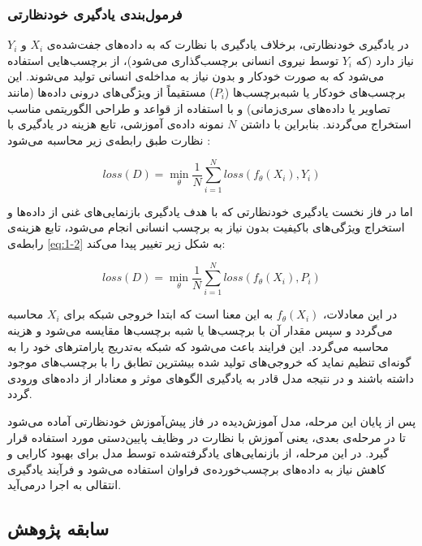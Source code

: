 \subsubsection{فرمول‌بندی یادگیری خودنظارتی}

در یادگیری خودنظارتی، برخلاف یادگیری با نظارت که به داده‌های جفت‌شده‌ی $X_i$ و $Y_i$ نیاز دارد (که $Y_i$ توسط نیروی انسانی برچسب‌گذاری می‌شود)، از برچسب‌هایی استفاده می‌شود که به صورت خودکار و بدون نیاز به مداخله‌ی انسانی تولید می‌شوند. این برچسب‌های خودکار یا شبه‌برچسب‌ها ($P_i$) مستقیماً از ویژگی‌های درونی داده‌ها (مانند تصاویر یا داده‌های سری‌زمانی) و با استفاده از قواعد و طراحی الگوریتمی مناسب استخراج می‌گردند. بنابراین با داشتن $N$ نمونه داده‌ی آموزشی، تابع هزینه در یادگیری با نظارت طبق رابطه‌ی زیر محاسبه می‌شود \cite{jing2020self}:

\begin{equation}
\label{eq:1-2}
loss(D) = \min_{\theta} \frac{1}{N} \sum_{i=1}^{N} loss(f_θ(X_i), Y_i)
\end{equation}

اما در فاز نخست یادگیری خودنظارتی که با هدف یادگیری بازنمایی‌های غنی از داده‌ها و استخراج ویژگی‌های باکیفیت بدون نیاز به برچسب انسانی انجام می‌شود، تابع هزینه‌ی رابطه‌ی \ref{eq:1-2} به شکل زیر تغییر پیدا می‌کند:

\begin{equation}
\label{eq:2-2}
loss(D) = \min_{\theta} \frac{1}{N} \sum_{i=1}^{N} loss(f_θ(X_i), P_i)
\end{equation}

در این معادلات، $f_θ(X_i)$ به این معنا است که ابتدا خروجی شبکه برای $X_i$ محاسبه می‌گردد و سپس مقدار آن با برچسب‌ها یا شبه برچسب‌ها مقایسه می‌شود و هزینه محاسبه می‌گردد. این فرایند باعث می‌شود که شبکه به‌تدریج پارامترهای خود را به گونه‌ای تنظیم نماید که خروجی‌های تولید شده بیشترین تطابق را با برچسب‌های موجود داشته باشند و در نتیجه مدل قادر به یادگیری الگوهای موثر و معنادار از داده‌های ورودی گردد.

پس از پایان این مرحله، مدل آموزش‌دیده در فاز پیش‌آموزش خودنظارتی آماده می‌شود تا در مرحله‌ی بعدی، یعنی آموزش با نظارت در وظایف پایین‌دستی مورد استفاده قرار گیرد. در این مرحله، از بازنمایی‌های یادگرفته‌شده توسط مدل برای بهبود کارایی و کاهش نیاز به داده‌های برچسب‌خورده‌ی فراوان استفاده می‌شود و فرآیند یادگیری انتقالی به اجرا درمی‌آید.

\subsection{سابقه پژوهش}

